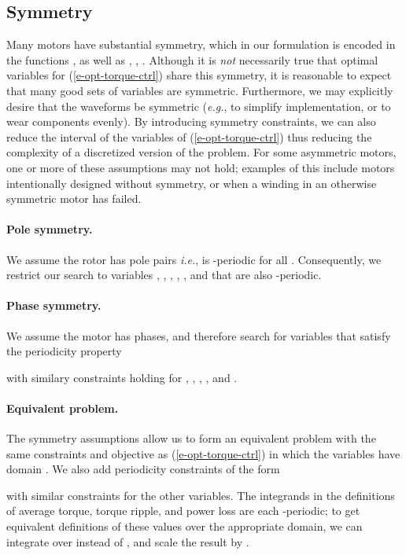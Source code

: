 \documentclass[11pt]{article}
\newcommand{\eg}{{\it e.g.}}
\newcommand{\ie}{{\it i.e.}}
\begin{document}
\subsection{Symmetry}
\label{s-symmetry}
Many motors have substantial symmetry,
which in our formulation is encoded in the functions , 
as well as , , .
Although it is \emph{not} necessarily true that 
optimal variables for (\ref{e-opt-torque-ctrl}) share this symmetry,
it is reasonable to expect that many good sets of variables are symmetric.
Furthermore, we may explicitly desire that the waveforms be symmetric
(\eg, to simplify implementation, or to wear components evenly).
By introducing symmetry constraints, 
we can also reduce the interval of the variables of (\ref{e-opt-torque-ctrl})
thus reducing the complexity of a 
discretized version of the problem.
For some asymmetric motors,
one or more of these assumptions may not hold;
examples of this include motors intentionally designed without symmetry,
or when a winding in an otherwise symmetric motor has failed.

\paragraph{Pole symmetry.}
We assume the rotor has  pole pairs
\ie,  is -periodic for all .
Consequently, we restrict our search to
variables , , , , , and  that are also
-periodic.

\paragraph{Phase symmetry.} 
We assume the motor has  phases,
and therefore search for variables that satisfy the periodicity property

with similary constraints holding for
, , , , and .

\paragraph{Equivalent problem.} 
The symmetry assumptions allow us to form an equivalent problem with 
the same constraints and objective as 
(\ref{e-opt-torque-ctrl})
in which the variables have domain 
.  
We also add periodicity constraints of the form

with similar constraints for the other variables.
The integrands in the definitions of
average torque, torque ripple, and power loss 
are each -periodic; 
to get equivalent definitions of these values over the appropriate domain,
we can integrate over  instead of , 
and scale the result by .
\end{document}
